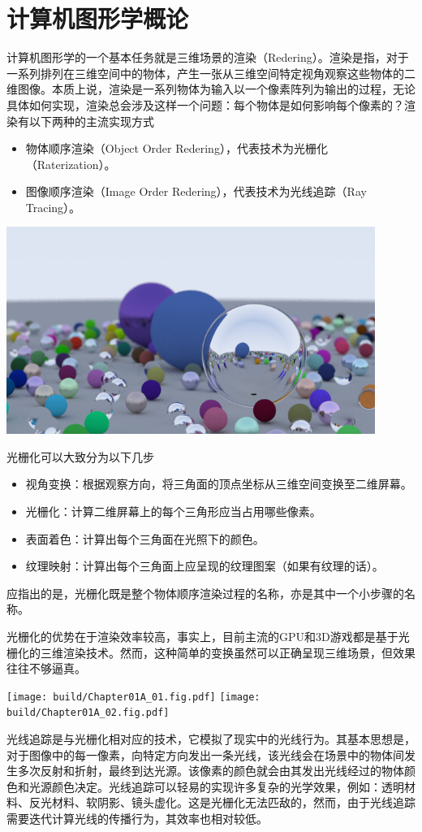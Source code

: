 \chapter{计算机图形学概论}

计算机图形学的一个基本任务就是三维场景的渲染（Redering）。渲染是指，对于一系列排列在三维空间中的物体，产生一张从三维空间特定视角观察这些物体的二维图像。本质上说，渲染是一系列物体为输入以一个像素阵列为输出的过程，无论具体如何实现，渲染总会涉及这样一个问题：每个物体是如何影响每个像素的？渲染有以下两种的主流实现方式
\begin{itemize}
    \item 物体顺序渲染（Object Order Redering），代表技术为光栅化（Raterization）。
    \item 图像顺序渲染（Image Order Redering），代表技术为光线追踪（Ray Tracing）。
\end{itemize}

\begin{Figure}
    \includegraphics[width=12cm]{image/Final.png}
\end{Figure}

光栅化可以大致分为以下几步
\begin{itemize}
    \item 视角变换：根据观察方向，将三角面的顶点坐标从三维空间变换至二维屏幕。
    \item 光栅化：计算二维屏幕上的每个三角形应当占用哪些像素。
    \item 表面着色：计算出每个三角面在光照下的颜色。
    \item 纹理映射：计算出每个三角面上应呈现的纹理图案（如果有纹理的话）。
\end{itemize}
应指出的是，光栅化既是整个物体顺序渲染过程的名称，亦是其中一个小步骤的名称。

光栅化的优势在于渲染效率较高，事实上，目前主流的GPU和3D游戏都是基于光栅化的三维渲染技术。然而，这种简单的变换虽然可以正确呈现三维场景，但效果往往不够逼真。

\begin{Figure}
    \texttt{[image: build/Chapter01A\_01.fig.pdf]}
    \texttt{[image: build/Chapter01A\_02.fig.pdf]}
\end{Figure}

光线追踪是与光栅化相对应的技术，它模拟了现实中的光线行为。其基本思想是，对于图像中的每一像素，向特定方向发出一条光线，该光线会在场景中的物体间发生多次反射和折射，最终到达光源。该像素的颜色就会由其发出光线经过的物体颜色和光源颜色决定。光线追踪可以轻易的实现许多复杂的光学效果，例如：透明材料、反光材料、软阴影、镜头虚化。这是光栅化无法匹敌的，然而，由于光线追踪需要迭代计算光线的传播行为，其效率也相对较低。